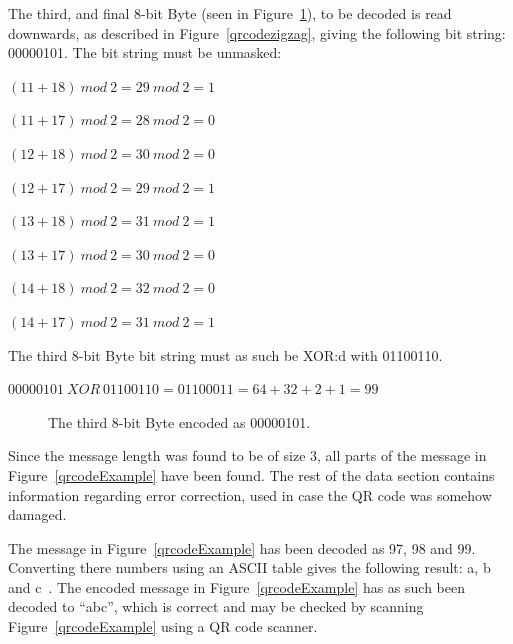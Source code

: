 The third, and final 8-bit Byte (seen in Figure~\ref{qrcodeExampleStep8}), to be decoded is read downwards, as described in Figure~\ref{qrcodezigzag}, giving the following bit string: 00000101. The bit string must be unmasked:

\begin{center}

\((11+18)~mod~2=29~mod~2=1\)

\((11+17)~mod~2=28~mod~2=0\)

\((12+18)~mod~2=30~mod~2=0\)

\((12+17)~mod~2=29~mod~2=1\)

\((13+18)~mod~2=31~mod~2=1\) 

\((13+17)~mod~2=30~mod~2=0\)

\((14+18)~mod~2=32~mod~2=0\)

\((14+17)~mod~2=31~mod~2=1\)

\end{center}

The third 8-bit Byte bit string must as such be XOR:d with 01100110.

\begin{center}
\(00000101~XOR~01100110 = 01100011 = 64 + 32 + 2 + 1 = 99\)
\end{center}

	\begin{figure}[H]%
		\centering
		\caption{The third 8-bit Byte encoded as 00000101.}
		\label{qrcodeExampleStep8}
	\end{figure}

Since the message length was found to be of size 3, all parts of the message in Figure~\ref{qrcodeExample} have been found. The rest of the data section contains information regarding error correction, used in case the QR code was somehow damaged.

The message in Figure~\ref{qrcodeExample} has been decoded as 97, 98 and 99. Converting there numbers using an ASCII table gives the following result: a, b and c~\cite{asciitable}. The encoded message in Figure~\ref{qrcodeExample} has as such been decoded to ``abc'', which is correct and may be checked by scanning Figure~\ref{qrcodeExample} using a QR code scanner.

